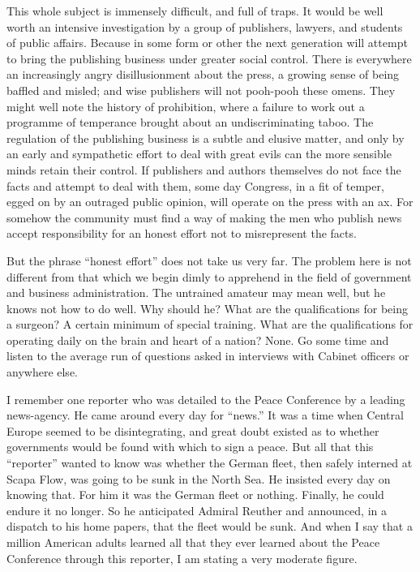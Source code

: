 \documentclass[openany,nobib,twoside,nohyper]{tufte-book}
\begin{document}
This whole subject is immensely difficult, and full of traps. It would
be well worth an intensive investigation by a group of publishers,
lawyers, and students of public affairs. Because in some form or other
the next generation will attempt to bring the publishing business under
greater social control. There is everywhere an increasingly angry
disillusionment about the press, a growing sense of being baffled and
misled; and wise publishers will not pooh-pooh these omens. They might
well note the history of prohibition, where a failure to work out a
programme of temperance brought about an undiscriminating taboo. The
regulation of the publishing business is a subtle and elusive matter,
and only by an early and sympathetic effort to deal with great evils can
the more sensible minds retain their control. If publishers and authors
themselves do not face the facts and attempt to deal with them, some day
Congress, in a fit of temper, egged on by an outraged public opinion,
will operate on the press with an ax. For somehow the community must
find a way of making the men who publish news accept responsibility for
an honest effort not to misrepresent the facts.

But the phrase ``honest effort'' does not take us very far. The problem
here is not different from that which we begin dimly to apprehend in the
field of government and business administration. The untrained amateur
may mean well, but he knows not how to do well. Why should he? What are
the qualifications for being a surgeon? A certain minimum of special
training. What are the qualifications for operating daily on the brain
and heart of a nation? None. Go some time and listen to the average run
of questions asked in interviews with Cabinet officers or anywhere else.

\enlargethispage{\baselineskip}

I remember one reporter who was detailed to the Peace Conference by a
leading news-agency. He came around every day for ``news.'' It was a
time when Central Europe seemed to be disintegrating, and great doubt
existed as to whether governments would be found with which to sign a
peace. But all that this ``reporter'' wanted to know was whether the
German fleet, then safely interned at Scapa Flow, was going to be sunk
in the North Sea. He insisted every day on knowing that. For him it was
the German fleet or nothing. Finally, he could endure it no longer. So
he anticipated Admiral Reuther and announced, in a dispatch to his home
papers, that the fleet would be sunk. And when I say that a million
American adults learned all that they ever learned about the Peace
Conference through this reporter, I am stating a very moderate figure.
\end{document}
